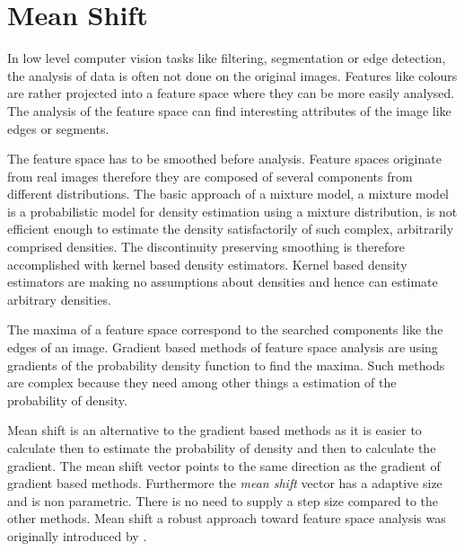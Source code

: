 \chapter{Mean Shift}\label{ch:mean_shift}
In low level computer vision tasks like filtering, segmentation or
edge detection, the analysis of data is often not done on the original
images.  Features like colours are rather projected into a feature
space where they can be more easily analysed. The analysis of the
feature space can find interesting attributes of the image like edges
or segments.

The feature space has to be smoothed before analysis. Feature spaces
originate from real images therefore they are composed of several
components from different distributions. The basic approach of a
mixture model, a mixture model is a probabilistic model for density
estimation using a mixture distribution, is not efficient enough to
estimate the density satisfactorily of such complex, arbitrarily
comprised densities. The discontinuity preserving smoothing is
therefore accomplished with kernel based density estimators. Kernel
based density estimators are making no assumptions about densities and
hence can estimate arbitrary densities.

The maxima of a feature space correspond to the searched components
like the edges of an image. Gradient based methods of feature space
analysis are using gradients of the probability density function to
find the maxima. Such methods are complex because they need among
other things a estimation of the probability of density.

Mean shift is an alternative to the gradient based methods as it is
easier to calculate then to estimate the probability of density and
then to calculate the gradient. The mean shift vector points to the
same direction as the gradient of gradient based methods. Furthermore
the \emph{mean shift} vector has a adaptive size and is non
parametric. There is no need to supply a step size compared to the
other methods. Mean shift a robust approach toward feature space
analysis was originally introduced by \citeauthor{citeulike:462300}
\citep{citeulike:462300}.

